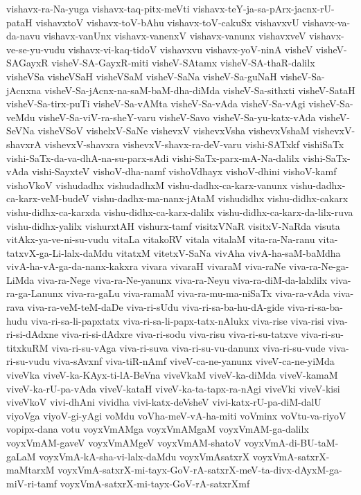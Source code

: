 {vishavx-ra-Na-yuga
vishavx-taq-pitx-meVti
vishavx-teY-ja-sa-pArx-jacnx-rU-pataH
vishavxtoV
vishavx-toV-bAhu
vishavx-toV-cakuSx
vishavxvU
vishavx-va-da-navu
vishavx-vanUnx
vishavx-vanenxV
vishavx-vanunx
vishavxveV
vishavx-ve-se-yu-vudu
vishavx-vi-kaq-tidoV
vishavxvu
vishavx-yoV-ninA
visheV
visheV-SAGayxR
visheV-SA-GayxR-miti
visheV-SAtamx
visheV-SA-thaR-dalilx
visheVSa
visheVSaH
visheVSaM
visheV-SaNa
visheV-Sa-guNaH
visheV-Sa-jAcnxna
visheV-Sa-jAcnx-na-saM-baM-dha-diMda
visheV-Sa-sithxti
visheV-SataH
visheV-Sa-tirx-puTi
visheV-Sa-vAMta
visheV-Sa-vAda
visheV-Sa-vAgi
visheV-Sa-veMdu
visheV-Sa-viV-ra-sheY-varu
visheV-Savo
visheV-Sa-yu-katx-vAda
visheV-SeVNa
visheVSoV
vishelxV-SaNe
vishevxV
vishevxVsha
vishevxVshaM
vishevxV-shavxrA
vishevxV-shavxra
vishevxV-shavx-ra-deV-varu
vishi-SATxkf
vishiSaTx
vishi-SaTx-da-va-dhA-na-su-parx-sAdi
vishi-SaTx-parx-mA-Na-dalilx
vishi-SaTx-vAda
vishi-SayxteV
vishoV-dha-namf
vishoVdhayx
vishoV-dhini
vishoV-kamf
vishoVkoV
vishudadhx
vishudadhxM
vishu-dadhx-ca-karx-vanunx
vishu-dadhx-ca-karx-veM-budeV
vishu-dadhx-ma-nanx-jAtaM
vishudidhx
vishu-didhx-cakarx
vishu-didhx-ca-karxda
vishu-didhx-ca-karx-dalilx
vishu-didhx-ca-karx-da-lilx-ruva
vishu-didhx-yalilx
vishurxtAH
vishurx-tamf
visitxVNaR
visitxV-NaRda
visuta
vitAkx-ya-ve-ni-su-vudu
vitaLa
vitakoRV
vitala
vitalaM
vita-ra-Na-ranu
vita-tatxvX-ga-Li-lalx-daMdu
vitatxM
vitetxV-SaNa
vivAha
vivA-ha-saM-baMdha
vivA-ha-vA-ga-da-nanx-kakxra
vivara
vivaraH
vivaraM
viva-raNe
viva-ra-Ne-ga-LiMda
viva-ra-Nege
viva-ra-Ne-yanunx
viva-ra-Neyu
viva-ra-diM-da-lalxlilx
viva-ra-ga-Lanunx
viva-ra-gaLu
viva-ramaM
viva-ra-mu-ma-niSaTx
viva-ra-vAda
viva-rava
viva-ra-veM-teM-daDe
viva-ri-sUdu
viva-ri-sa-ba-hu-dA-gide
viva-ri-sa-ba-hudu
viva-ri-sa-li-papxtatx
viva-ri-sa-li-papx-tatx-nAlukx
viva-rise
viva-risi
viva-ri-si-dAdxne
viva-ri-si-dAdxre
viva-ri-sodu
viva-risu
viva-ri-su-tatxve
viva-ri-su-titxkuRM
viva-ri-su-vAga
viva-ri-suva
viva-ri-su-vu-danunx
viva-ri-su-vude
viva-ri-su-vudu
viva-sAvxnf
viva-tiR-nAmf
viveV-ca-ne-yanunx
viveV-ca-ne-yiMda
viveVka
viveV-ka-KAyx-ti-lA-BeVna
viveVkaM
viveV-ka-diMda
viveV-kamaM
viveV-ka-rU-pa-vAda
viveV-kataH
viveV-ka-ta-tapx-ra-nAgi
viveVki
viveV-kisi
viveVkoV
vivi-dhAni
vividha
vivi-katx-deVsheV
vivi-katx-rU-pa-diM-dalU
viyoVga
viyoV-gi-yAgi
voMdu
voVha-meV-vA-ha-miti
voVminx
voVtu-va-riyoV
vopipx-dana
votu
voyxVmAMga
voyxVmAMgaM
voyxVmAM-ga-dalilx
voyxVmAM-gaveV
voyxVmAMgeV
voyxVmAM-shatoV
voyxVmA-di-BU-taM-gaLaM
voyxVmA-kA-sha-vi-lalx-daMdu
voyxVmAsatxrX
voyxVmA-satxrX-maMtarxM
voyxVmA-satxrX-mi-tayx-GoV-rA-satxrX-meV-ta-divx-dAyxM-ga-miV-ri-tamf
voyxVmA-satxrX-mi-tayx-GoV-rA-satxrXmf
}
